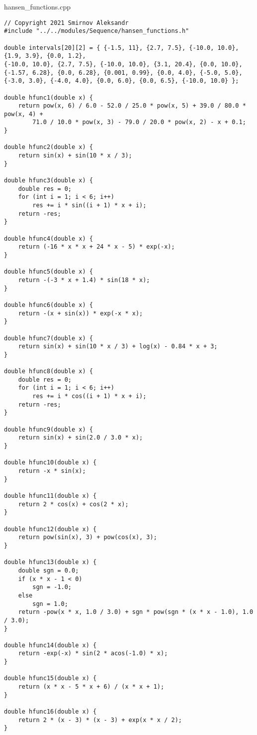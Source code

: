 \documentclass{report}
\begin{document}
hansen\_functions.cpp
\begin{lstlisting}
// Copyright 2021 Smirnov Aleksandr
#include "../../modules/Sequence/hansen_functions.h"

double intervals[20][2] = { {-1.5, 11}, {2.7, 7.5}, {-10.0, 10.0}, {1.9, 3.9}, {0.0, 1.2},
{-10.0, 10.0}, {2.7, 7.5}, {-10.0, 10.0}, {3.1, 20.4}, {0.0, 10.0},
{-1.57, 6.28}, {0.0, 6.28}, {0.001, 0.99}, {0.0, 4.0}, {-5.0, 5.0},
{-3.0, 3.0}, {-4.0, 4.0}, {0.0, 6.0}, {0.0, 6.5}, {-10.0, 10.0} };

double hfunc1(double x) {
    return pow(x, 6) / 6.0 - 52.0 / 25.0 * pow(x, 5) + 39.0 / 80.0 * pow(x, 4) +
        71.0 / 10.0 * pow(x, 3) - 79.0 / 20.0 * pow(x, 2) - x + 0.1;
}

double hfunc2(double x) {
    return sin(x) + sin(10 * x / 3);
}

double hfunc3(double x) {
    double res = 0;
    for (int i = 1; i < 6; i++)
        res += i * sin((i + 1) * x + i);
    return -res;
}

double hfunc4(double x) {
    return (-16 * x * x + 24 * x - 5) * exp(-x);
}

double hfunc5(double x) {
    return -(-3 * x + 1.4) * sin(18 * x);
}

double hfunc6(double x) {
    return -(x + sin(x)) * exp(-x * x);
}

double hfunc7(double x) {
    return sin(x) + sin(10 * x / 3) + log(x) - 0.84 * x + 3;
}

double hfunc8(double x) {
    double res = 0;
    for (int i = 1; i < 6; i++)
        res += i * cos((i + 1) * x + i);
    return -res;
}

double hfunc9(double x) {
    return sin(x) + sin(2.0 / 3.0 * x);
}

double hfunc10(double x) {
    return -x * sin(x);
}

double hfunc11(double x) {
    return 2 * cos(x) + cos(2 * x);
}

double hfunc12(double x) {
    return pow(sin(x), 3) + pow(cos(x), 3);
}

double hfunc13(double x) {
    double sgn = 0.0;
    if (x * x - 1 < 0)
        sgn = -1.0;
    else
        sgn = 1.0;
    return -pow(x * x, 1.0 / 3.0) + sgn * pow(sgn * (x * x - 1.0), 1.0 / 3.0);
}

double hfunc14(double x) {
    return -exp(-x) * sin(2 * acos(-1.0) * x);
}

double hfunc15(double x) {
    return (x * x - 5 * x + 6) / (x * x + 1);
}

double hfunc16(double x) {
    return 2 * (x - 3) * (x - 3) + exp(x * x / 2);
}


\end{lstlisting}
\end{document}
